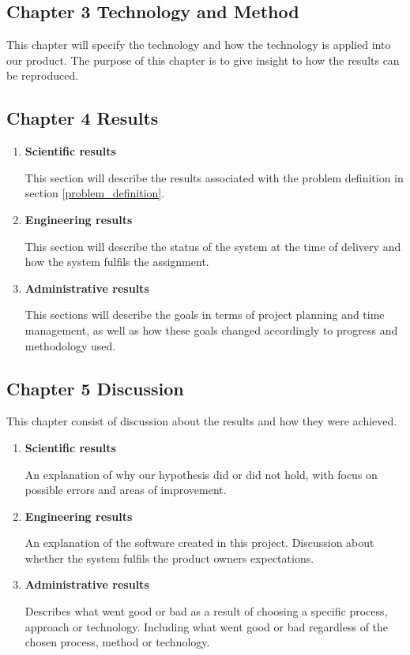 \subsection{Chapter 3 Technology and Method}
This chapter will specify the technology and how the technology is applied into our product. The purpose of this chapter is to give insight to how the results can be reproduced.

\subsection{Chapter 4 Results}
\begin{enumerate}
    \item \textbf{Scientific results}
    
    This section will describe the results associated with the problem definition in section \ref{problem_definition}.
    
    \item \textbf{Engineering results}
    
    This section will describe the status of the system at the time of delivery and how the system fulfils the assignment.
    
    \item \textbf{Administrative results}
    
    This sections will describe the goals in terms of project planning and time management, as well as how these goals changed accordingly to progress and methodology used.
\end{enumerate}

\subsection{Chapter 5 Discussion}
This chapter consist of discussion about the results and how they were achieved.
\begin{enumerate}
    \item \textbf{Scientific results}
    
    An explanation of why our hypothesis did or did not hold, with focus on possible errors and areas of improvement.
    
    \item \textbf{Engineering results}
    
    An explanation of the software created in this project. Discussion about whether the system fulfils the product owners expectations.
    
    \item \textbf{Administrative results}
    
    Describes what went good or bad as a result of choosing a specific process, approach or technology. Including what went good or bad regardless of the chosen process, method or technology.
    
\end{enumerate}

